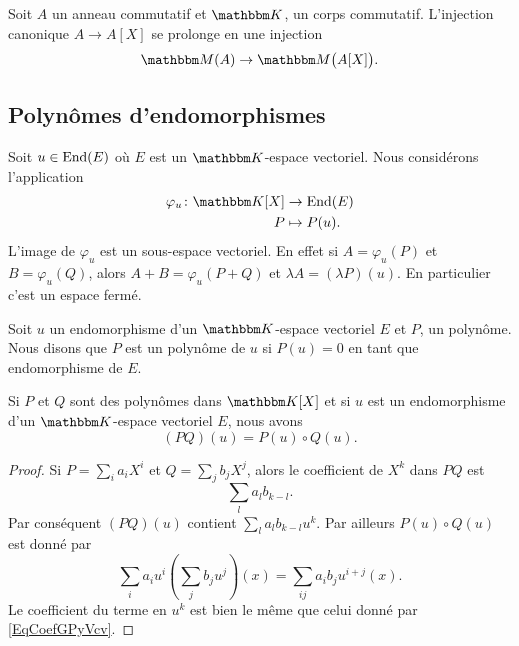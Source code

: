 Soit \( A\) un anneau commutatif et \( \eK\), un corps commutatif. L'injection canonique \( A\to A[X]\) se prolonge en une injection
\begin{equation}
   \eM(A)\to\eM\big( A[X] \big).
\end{equation}

\subsection{Polynômes d'endomorphismes}

Soit \( u\in\operatorname{End}(E)\) où \( E\) est un \( \eK\)-espace vectoriel. Nous considérons l'application
\begin{equation}    \label{EqOVKooeMJuv}
    \begin{aligned}
        \varphi_u\colon \eK[X]&\to \End(E) \\
        P&\mapsto P(u).
    \end{aligned}
\end{equation}
L'image de \( \varphi_u\) est un sous-espace vectoriel. En effet si \( A=\varphi_u(P)\) et \( B=\varphi_u(Q)\), alors \( A+B=\varphi_u(P+Q)\) et \( \lambda A=(\lambda P)(u)\). En particulier c'est un espace fermé.

Soit \( u\) un endomorphisme d'un \( \eK\)-espace vectoriel \( E\) et \( P\), un polynôme. Nous disons que \( P\) est un polynôme  de \( u\) si \( P(u)=0\) en tant que endomorphisme de \( E\).

\begin{lemma}       \label{LemQWvhYb}
    Si \( P\) et \( Q\) sont des polynômes dans \( \eK[X]\) et si \( u\) est un endomorphisme d'un \( \eK\)-espace vectoriel \( E\), nous avons
    \begin{equation}
        (PQ)(u)=P(u)\circ Q(u).
    \end{equation}
\end{lemma}

\begin{proof}
    Si \( P=\sum_i a_iX^i\) et \( Q=\sum_j b_jX^j\), alors le coefficient de \( X^k\) dans \( PQ\) est
    \begin{equation}        \label{EqCoefGPyVcv}
        \sum_la_lb_{k-l}.
    \end{equation}
    Par conséquent \( (PQ)(u)\) contient \( \sum_la_lb_{k-l}u^k\). Par ailleurs \( P(u)\circ Q(u)\) est donné par
    \begin{equation}
        \sum_ia_iu^i\left( \sum_jb_ju^j \right)(x)=\sum_{ij}a_ib_ju^{i+j}(x).
    \end{equation}
    Le coefficient du terme en \( u^k\) est bien le même que celui donné par \eqref{EqCoefGPyVcv}.
\end{proof}

